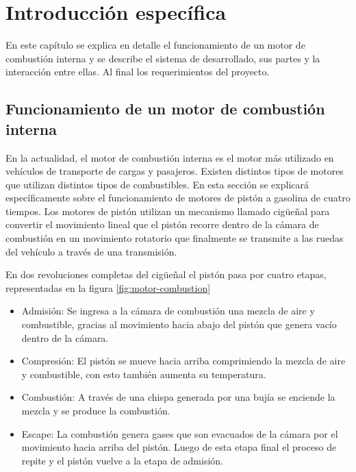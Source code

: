 \chapter{Introducción específica} %

\label{Chapter2}

En este capítulo se explica en detalle el funcionamiento de un motor de combustión interna y se describe el sistema de desarrollado, sus partes y la interacción entre ellas. Al final los requerimientos del proyecto.

\section{Funcionamiento de un motor de combustión interna} \label{func-motor}

En la actualidad, el motor de combustión interna es el motor más utilizado en vehículos de transporte de cargas y pasajeros. Existen distintos tipos de motores que utilizan distintos tipos de combustibles. En esta sección se explicará específicamente sobre el funcionamiento de motores de pistón a gasolina de cuatro tiempos. Los motores de pistón utilizan un mecanismo llamado cigüeñal para convertir el movimiento lineal que el pistón recorre dentro de la cámara de combustión en un movimiento rotatorio que finalmente se transmite a las ruedas del vehículo a través de una transmisión.

En dos revoluciones completas del cigüeñal el pistón pasa por cuatro etapas, representadas en la figura \ref{fig:motor-combustion}
\begin{itemize}
\item{Admisión:} Se ingresa a la cámara de combustión una mezcla de aire y combustible, gracias al movimiento hacia abajo del pistón que genera vacío dentro de la cámara.
\item{Compresión:} El pistón se mueve hacia arriba comprimiendo la mezcla de aire y combustible, con esto también aumenta su temperatura.
\item{Combustión:} A través de una chispa generada por una bujía se enciende la mezcla y se produce la combustión.
\item{Escape:} La combustión genera gases que son evacuados de la cámara por el movimiento hacia arriba del pistón. Luego de esta etapa final el proceso de repite y el pistón vuelve a la etapa de admisión.
\end{itemize}

